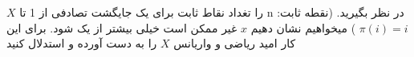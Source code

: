 
$X$ را تغداد نقاط ثابت برای یک جایگشت تصادفی از 1 تا n در نظر بگیرید. (نقطه ثابت: $\pi(i)=i$ ) میخواهیم نشان دهیم $x$ غیر ممکن است خیلی بیشتر از یک شود. برای این کار امید ریاضی و واریانس $X$ را به دست آورده و استدلال کنید\\
